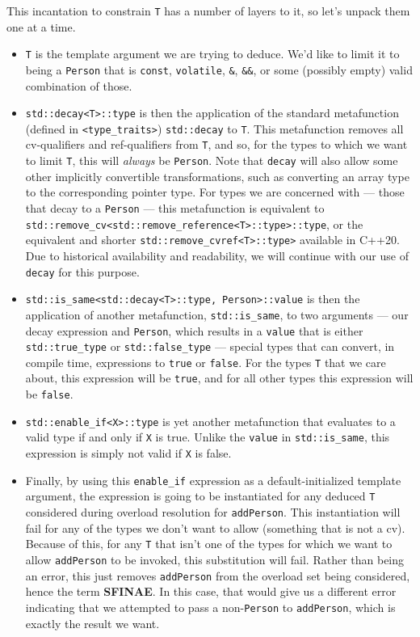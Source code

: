 \noindent This incantation to constrain \texttt{T} has a number of layers to it,
so let's unpack them one at a time.
\begin{itemize}
\item{\texttt{T} is the template argument we are trying to deduce. We’d like to limit it to being a \texttt{Person} that is \texttt{const}, \texttt{volatile}, \texttt{\&}, \texttt{\&\&}, or some (possibly empty) valid combination of those.}
\item{\texttt{std::decay<T>::type} is then the application of the standard metafunction (defined in \texttt{<type\_traits>}) \texttt{std::decay} to \texttt{T}. This metafunction removes all cv-qualifiers and ref-qualifiers from \texttt{T}, and so, for the types to which we want to limit \texttt{T}, this will \emph{always} be \texttt{Person}. Note that \texttt{decay} will also allow some other implicitly convertible transformations, such as converting an array type to the corresponding pointer type. For types we are concerned with --- those that decay to a \texttt{Person} --- this metafunction is equivalent to \texttt{std::remove\_cv<std::remove\_reference<T>::type>::type}, or the equivalent and shorter \texttt{std::remove\_cvref<T>::type>} available in C++20. Due to historical availability and readability, we will continue with our use of \texttt{decay} for this purpose.}
\item{\texttt{std::is\_same<std::decay<T>::type,}~\texttt{Person>::value} is then the application of another metafunction, \texttt{std::is\_same}, to two arguments --- our decay expression and \texttt{Person}, which results in a \texttt{value} that is either \texttt{std::true\_type} or \texttt{std::false\_type} --- special types that can convert, in compile time, expressions to \texttt{true} or \texttt{false}. For the types \texttt{T} that we care about, this expression will be \texttt{true}, and for all other types this expression will be \texttt{false}.}
\item{\texttt{std::enable\_if<X>::type} is yet another metafunction that evaluates to a valid type if and only if \texttt{X} is true. Unlike the \texttt{value} in \texttt{std::is\_same}, this expression is simply not valid if \texttt{X} is false.}
\item{Finally, by using this \texttt{enable\_if} expression as a default-initialized template argument, the expression is going to be instantiated for any deduced \texttt{T} considered during overload resolution for \texttt{addPerson}. This instantiation will fail for any of the types we don’t want to allow (something that is not a cv). Because of this, for any \texttt{T} that isn’t one of the types for which we want to allow \texttt{addPerson} to be invoked, this substitution will fail. Rather than being an error, this just removes \texttt{addPerson} from the overload set being considered, hence the term \textbf{SFINAE}. In this case, that would give us a different error indicating that we attempted to pass a non-\texttt{Person} to \texttt{addPerson}, which is exactly the result we want.}
\end{itemize}
